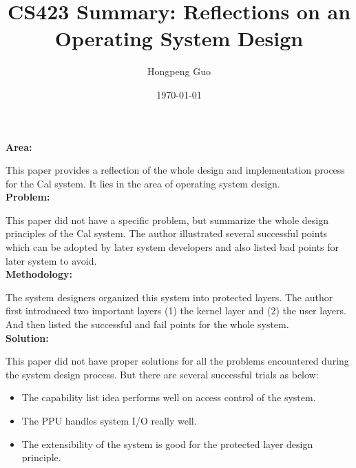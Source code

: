 \documentclass[10pt]{article}
\title{CS423 Summary: Reflections on an Operating System Design}
\author{Hongpeng Guo}
\date{\today}
\begin{document}
\maketitle

\noindent
{\bf Area:}

This paper provides a reflection of the whole design and implementation process for the Cal system. It lies in the area of operating system design.
\\

\noindent
{\bf Problem:}

This paper did not have a specific problem, but summarize the whole design principles of the Cal system. The author illustrated several successful points which can be adopted by later system developers and also listed bad points for later system to avoid. 
\\

\noindent
{\bf Methodology:}

The system designers organized this system into protected layers. The author first introduced two important layers (1) the kernel layer and (2) the user layers. And then listed the successful and fail points for the whole system.
\\

\noindent
{\bf Solution:}

This paper did not have proper solutions for all the problems encountered during the system design process. But there are several successful trials as below:
\begin{itemize}
\item
The capability list idea performs well on access control of the system.
\item
The PPU handles system I/O really well.
\item
The extensibility of the system is good for the protected layer design principle.
\end{itemize}

\noindent
{\bf Results:}

Finally the project was terminated for lack of funds. the system was neither
efficient enough nor usable enough to be put into service by the computer center.
\\

\noindent
{\bf Takeaway:}

Successful points include (1) the use of capabilities, (2) the idea of protected layering, (3) the conversion of input-output devices into processes with a minimum of interpretation, ... etc.
Lessons learned include (1) the attempt to provide the illusion of a mapped address space on unsuitable hardware (2) the way in which the disk was incorporated into the memory hierarchy, (3) include a layer of memory in future system design process.
\end{document}
